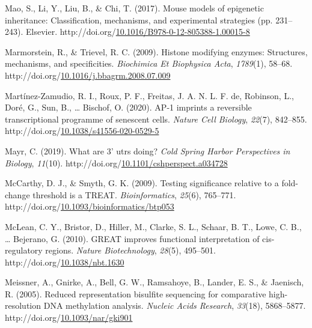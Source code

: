 \documentclass[12pt,twoside]{reedthesis}
\newlength{\cslhangindent}
\newenvironment{CSLReferences}[2] %
 {%
  \setlength{\parindent}{0pt}
  \ifodd #1 \everypar{\setlength{\hangindent}{\cslhangindent}}\ignorespaces\fi
  \ifnum #2 > 0
  \setlength{\parskip}{#2\baselineskip}
  \fi
 }%
 {}
\begin{document}
\begin{CSLReferences}{1}{0}
\leavevmode{}%
Mao, S., Li, Y., Liu, B., \& Chi, T. (2017). Mouse models of epigenetic inheritance: Classification, mechanisms, and experimental strategies (pp. 231--243). Elsevier. http://doi.org/\href{https://doi.org/10.1016/B978-0-12-805388-1.00015-8}{10.1016/B978-0-12-805388-1.00015-8}

\leavevmode{}%
Marmorstein, R., \& Trievel, R. C. (2009). Histone modifying enzymes: Structures, mechanisms, and specificities. \emph{Biochimica Et Biophysica Acta}, \emph{1789}(1), 58--68. http://doi.org/\href{https://doi.org/10.1016/j.bbagrm.2008.07.009}{10.1016/j.bbagrm.2008.07.009}

\leavevmode{}%
Martínez-Zamudio, R. I., Roux, P. F., Freitas, J. A. N. L. F. de, Robinson, L., Doré, G., Sun, B., \ldots{} Bischof, O. (2020). AP-1 imprints a reversible transcriptional programme of senescent cells. \emph{Nature Cell Biology}, \emph{22}(7), 842--855. http://doi.org/\href{https://doi.org/10.1038/s41556-020-0529-5}{10.1038/s41556-020-0529-5}

\leavevmode{}%
Mayr, C. (2019). What are 3' utrs doing? \emph{Cold Spring Harbor Perspectives in Biology}, \emph{11}(10). http://doi.org/\href{https://doi.org/10.1101/cshperspect.a034728}{10.1101/cshperspect.a034728}

\leavevmode{}%
McCarthy, D. J., \& Smyth, G. K. (2009). Testing significance relative to a fold-change threshold is a TREAT. \emph{Bioinformatics}, \emph{25}(6), 765--771. http://doi.org/\href{https://doi.org/10.1093/bioinformatics/btp053}{10.1093/bioinformatics/btp053}

\leavevmode{}%
McLean, C. Y., Bristor, D., Hiller, M., Clarke, S. L., Schaar, B. T., Lowe, C. B., \ldots{} Bejerano, G. (2010). GREAT improves functional interpretation of cis-regulatory regions. \emph{Nature Biotechnology}, \emph{28}(5), 495--501. http://doi.org/\href{https://doi.org/10.1038/nbt.1630}{10.1038/nbt.1630}

\leavevmode{}%
Meissner, A., Gnirke, A., Bell, G. W., Ramsahoye, B., Lander, E. S., \& Jaenisch, R. (2005). Reduced representation bisulfite sequencing for comparative high-resolution DNA methylation analysis. \emph{Nucleic Acids Research}, \emph{33}(18), 5868--5877. http://doi.org/\href{https://doi.org/10.1093/nar/gki901}{10.1093/nar/gki901}


\end{CSLReferences}
\end{document}
